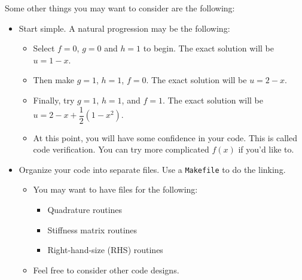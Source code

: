 \documentclass[11pt]{article}
\newcommand{\lr}[1]{\left(#1\right)}
\begin{document}
  Some other things you may want to consider are the following:
  \begin{itemize}
    \item Start simple.  A natural progression may be the following:
      \begin{itemize}
        \item Select $f = 0$, $g = 0$ and $h = 1$ to begin.  The exact solution will be $u = 1 - x$.
        \item Then make $g = 1$, $h = 1$, $f = 0$.  The exact solution will be $u = 2 - x$.
        \item Finally, try $g = 1$, $h = 1$, and $f = 1$.  The exact solution will be $u = 2 - x + \dfrac{1}{2}\lr{1 -
x^{2}}$.
        \item At this point, you will have some confidence in your code.  This is called code verification.  You can try more
complicated $f\lr{x}$ if you'd like to.
      \end{itemize}
    \item Organize your code into separate files.  Use a \texttt{Makefile} to do the linking.
      \begin{itemize}
        \item You may want to have files for the following:
          \begin{itemize}
            \item Quadrature routines 
            \item Stiffness matrix routines 
            \item Right-hand-size (RHS) routines
          \end{itemize}
        \item Feel free to consider other code designs.
      \end{itemize}
  \end{itemize}
  
    \begin{solution}
        
    \end{solution}
  
\end{document}
